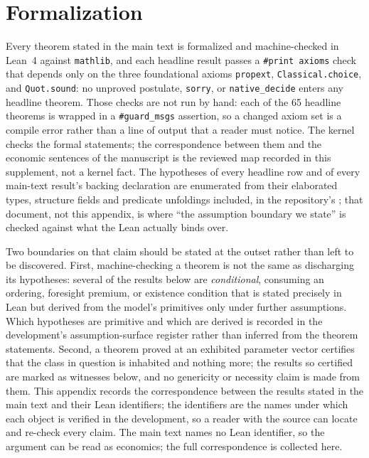 \section{Formalization}
\label{app:formalization}

Every theorem stated in the main text is formalized and
machine-checked in Lean~4 against \texttt{mathlib}, and each
headline result passes a \texttt{\#print axioms} check that depends
only on the three foundational axioms \texttt{propext},
\texttt{Classical.choice}, and \texttt{Quot.sound}: no unproved
postulate, \texttt{sorry}, or \texttt{native\_decide} enters any
headline theorem. Those checks are not run by hand: each of the
65 headline theorems is wrapped in a \texttt{\#guard\_msgs}
assertion, so a changed axiom set is a compile error rather than a
line of output that a reader must notice. The kernel checks the formal
statements; the correspondence between them and the economic sentences of
the manuscript is the reviewed map recorded in this supplement, not a
kernel fact. The hypotheses of every headline
row and of every main-text result's backing declaration are enumerated from
their elaborated types, structure fields and predicate unfoldings included,
in the repository's ; that document, not
this appendix, is where ``the assumption boundary we state'' is checked
against what the Lean actually binds over.

Two boundaries on that claim should be stated at the outset rather
than left to be discovered. First, machine-checking a theorem is not
the same as discharging its hypotheses: several of the results below
are \emph{conditional}, consuming an ordering, foresight premium, or existence
condition that is stated precisely in Lean but derived from the
model's primitives only under further assumptions. Which
hypotheses are primitive and which are derived is recorded in the
development's assumption-surface register rather than inferred from
the theorem statements. Second, a theorem proved at an exhibited
parameter vector certifies that the class in question is inhabited
and nothing more; the results so certified are marked as witnesses
below, and no genericity or necessity claim is made from them. This
appendix records the correspondence between the results stated in
the main text and their Lean identifiers; the identifiers are the
names under which each object is verified in the development, so a
reader with the source can locate and re-check every claim. The
main text names no Lean identifier, so the argument can be read as
economics; the full correspondence is collected here.

